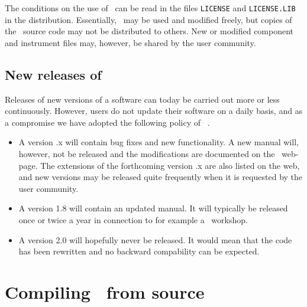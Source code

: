 The conditions on the use of \MCS\ can be read in the files
\verb+LICENSE+ and \verb+LICENSE.LIB+ in the distribution. Essentially,
\MCS\ may be used and modified freely, but copies of the \MCS\ source code 
may not be distributed to others. 
New or modified component and instrument files may, however, be shared by 
the user community.

\subsection{New releases of \MCS}
Releases of new versions of a software can today be carried out more or less
continuously. However, users do not update their software on a daily basis,
and as a compromise we have adopted the following policy of \MCS\ .

\begin{itemize}
\item A version {\version}.x will contain bug fixes and new functionality. A new manual
will, however, not be released and the modifications are documented on the
\MCS\ web-page. The extensions of the forthcoming version {\version}.x are also listed
on the web, and new versions may be released quite frequently when it is requested
by the user community.
\item A version 1.8 will contain an updated manual. It will typically be released
once or twice a year in connection to for example a \MCS\ workshop.
\item A version 2.0 will hopefully never be released. It would mean that the
code has been rewritten and no backward compability can be expected.
\end{itemize}

\section{Compiling \MCS\ from source}
\label{s:install}

